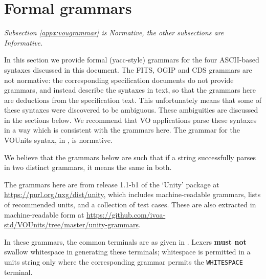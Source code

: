 \documentclass[11pt,a4paper]{ivoa}
\newcommand*\norm[1]{\textbf{\color{ivoacolor}#1}}
\begin{document}
\clearpage
\section{Formal grammars\label{appx:grammar}}

\emph{Subsection \ref{appx:vougrammar} is Normative, the other
    subsections are Informative.}

In this section we provide formal (yacc-style) grammars for the four
ASCII-based syntaxes discussed in this document.  The FITS, OGIP and
CDS grammars are not normative: the corresponding specification
documents do not provide grammars, and instead describe the syntaxes
in text, so that the grammars here are deductions from the
specification text.
This unfortunately means that some of these syntaxes were discovered to be ambiguous.
These ambiguities are discussed in the sections below.  We recommend
that VO applications parse these syntaxes in a way which is consistent
with the grammars here.
%
The grammar for the VOUnits syntax, in , is normative.

We believe that the grammars below are such that if a string
successfully parses in two distinct grammars, it means the same in
both.

The grammars here are from release 1.1-b1 of the `Unity' package at
\url{https://purl.org/nxg/dist/unity}, which includes machine-readable
grammars, lists of recommended units, and a collection of test cases.  These are also extracted in
machine-readable form
at \url{https://github.com/ivoa-std/VOUnits/tree/master/unity-grammars}.

In these grammars, the common terminals are as given in
.  Lexers \norm{must not} swallow whitespace
in generating these terminals; whitespace is permitted in a units
string only where the corresponding grammar permits
the \texttt{WHITESPACE} terminal.
\end{document}
